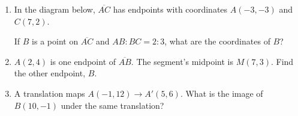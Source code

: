 \documentclass[12pt, twoside]{article}
\begin{document}
\begin{enumerate}
\newpage
\item In the diagram below, $\overline{AC}$ has endpoints with coordinates $A(-3,-3)$ and $C(7, 2)$.
  \begin{center} %
  \end{center}
  If $B$ is a point on $\overline{AC}$ and $AB {:} BC = 2{:}3$,  what  are  the coordinates of $B$? \vspace{4cm}

  \item $A(2,4)$ is one endpoint of $\overline{AB}$. The segment's midpoint is $M(7,3)$. Find the other endpoint, $B$. \vspace{3cm}

  \item A translation maps $A(-1,12) \rightarrow A'(5,6)$. What is the image of $B(10,-1)$ under the same translation?  \vspace{3cm}

\end{enumerate}
\end{document}
